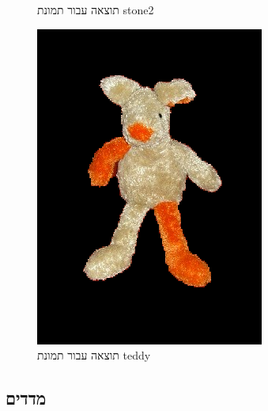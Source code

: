 \documentclass[a4paper,12pt]{article}
\begin{document}
\begin{figure}[H]
\begin{minipage}{0.3\textwidth}
        \caption{תוצאה עבור תמונת stone2}
    \end{minipage}
    \hfill
    \begin{minipage}{0.3\textwidth}
        \centering
        \includegraphics[width=\textwidth]{my_reasults/final_img/teddy_result.png}
        \caption{תוצאה עבור תמונת teddy}
    \end{minipage}
\end{figure}

\subsection*{מדדים}
\end{document}
